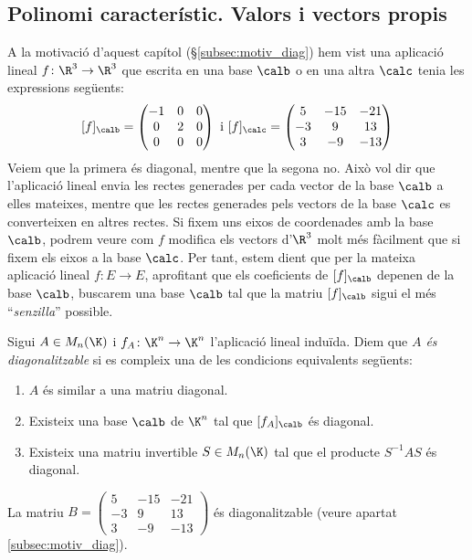 
\subsection{Polinomi característic. Valors i vectors propis}
A la motivació d'aquest capítol (\S\ref{subsec:motiv_diag}) hem vist una aplicació lineal $f\colon \R^3\to \R^3$ que escrita en una base $\calb$ o en una altra $\calc$ tenia les expressions següents:
$$
[f]_\calb=\begin{pmatrix}
-1 & 0 & 0 \\ 0 & 2 & 0 \\ 0 & 0 & 0
\end{pmatrix}
\text{ i }
[f]_\calc=\begin{pmatrix}
5 & -15 & -21 \\ -3 & 9 & 13 \\ 3 & -9 & -13
\end{pmatrix}
$$
Veiem que la primera és diagonal, mentre que la segona no. Això vol dir que l'aplicació lineal envia les rectes generades per cada vector de la base $\calb$ a elles mateixes, mentre que les rectes generades pels vectors de la base $\calc$ es converteixen en altres rectes. Si fixem uns eixos de coordenades amb la base $\calb$, podrem veure com $f$ modifica els vectors d'$\R^3$ molt més fàcilment que si fixem els eixos a la base $\calc$. Per tant, estem dient que per la mateixa aplicació lineal $f\colon E \to E$, aprofitant que els coeficients de $[f]_\calb$ depenen de la base $\calb$, buscarem una base $\calb$ tal que la matriu $[f]_\calb$ sigui el més ``\emph{senzilla}'' possible.
\begin{definicio}
Sigui $A \in M_n(\K)$ i $f_A\colon \K^n\to\K^n$ l'aplicació lineal induïda. Diem que \emph{$A$ és diagonalitzable} si es compleix una de les condicions equivalents següents:
\begin{enumerate}[\rm (a)]
    \item $A$ és similar a una matriu diagonal.
    \item Existeix una base $\calb$ de $\K^n$ tal que $[f_A]_\calb$ és diagonal.
    \item Existeix una matriu invertible $S\in M_n(\K)$ tal que el producte $S^{-1}AS$ és diagonal.
\end{enumerate}
\end{definicio}
\begin{exemple}
La matriu $B=\left(\begin{smallmatrix}
5 & -15 & -21 \\ -3 & 9 & 13 \\ 3 & -9 & -13
\end{smallmatrix}\right)$ és diagonalitzable (veure apartat \ref{subsec:motiv_diag}).
\end{exemple}
